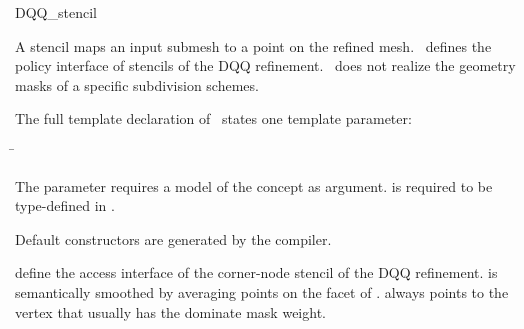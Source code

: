\begin{ccRefClass}{DQQ_stencil}

\ccDefinition

A stencil maps an input submesh to a point on the refined 
mesh. \ccClassTemplateName\ defines the policy interface of 
stencils of the DQQ refinement. \ccClassTemplateName\ does not
realize the geometry masks of a specific subdivision schemes.


\ccParameters

The full template declaration of \ccClassTemplateName\ states one
template parameter:

\begin{tabbing}
 \= 
\end{tabbing}
   
The  parameter requires a model of 
the  concept as argument.  
is required to be type-defined in .

\ccCreation

Default constructors are generated by the compiler.


\ccThree{}{}{}

{define the access interface of the corner-node stencil 
of the DQQ refinement. 
 is semantically smoothed by averaging points on 
the facet of .  always points to the vertex 
that usually has the dominate mask weight.}

\ccSeeAlso

\\
\\
\\

\end{ccRefClass}

\ccRefPageEnd



